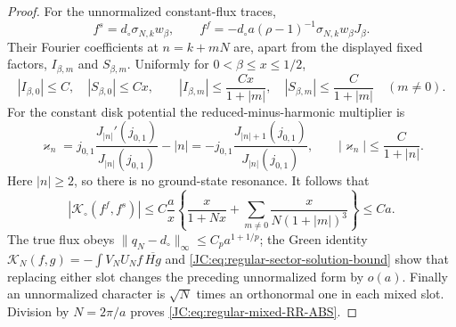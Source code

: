 \documentclass[11pt]{amsart}
\numberwithin{equation}{section}
\theoremstyle{definition}
\theoremstyle{remark}
\begin{document}
\begin{proof}
For the unnormalized constant-flux traces,
\[
 f^s=d_\circ\sigma_{N,k}w_\beta,\qquad
 f^f=-d_\circ a(\rho-1)^{-1}\sigma_{N,k}w_\beta J_\beta.
\]
Their Fourier coefficients at $n=k+mN$ are, apart from the displayed
fixed factors, $I_{\beta,m}$ and $S_{\beta,m}$.  Uniformly for
$0<\beta\le x\le1/2$,
\[
 |I_{\beta,0}|\le C,\quad |S_{\beta,0}|\le Cx,\qquad
 |I_{\beta,m}|\le\frac{Cx}{1+|m|},\quad
 |S_{\beta,m}|\le\frac C{1+|m|}\quad(m\ne0).
\]
For the constant disk potential the reduced-minus-harmonic multiplier is
\[
 \varkappa_n=j_{0,1}\frac{J_{|n|}'(j_{0,1})}{J_{|n|}(j_{0,1})}-|n|
 =-j_{0,1}\frac{J_{|n|+1}(j_{0,1})}{J_{|n|}(j_{0,1})},
 \qquad |\varkappa_n|\le\frac C{1+|n|}.
\]
Here $|n|\ge2$, so there is no ground-state resonance.  It follows that
\[
 |\mathcal K_\circ(f^f,f^s)|
 \le C\frac ax\left\{\frac{x}{1+Nx}
 +\sum_{m\ne0}\frac{x}{N(1+|m|)^3}\right\}\le Ca.
\]
The true flux obeys
$\|q_N-d_\circ\|_\infty\le C_pa^{1+1/p}$; the Green identity
$\mathcal K_N(f,g)=-\int V_NU_Nf\,\overline{Hg}$ and
\eqref{JC:eq:regular-sector-solution-bound} show that replacing either slot
changes the preceding unnormalized form by $o(a)$.  Finally an
unnormalized character is $\sqrt N$ times an orthonormal one in each
mixed slot.  Division by $N=2\pi/a$ proves
\eqref{JC:eq:regular-mixed-RR-ABS}.


\end{proof}
\end{document}
